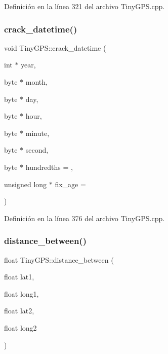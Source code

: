 Definición en la línea 321 del archivo Tiny\+G\+P\+S.\+cpp.

\mbox{\label{class_tiny_g_p_s_a2a9c14bdb5efa8f3f3b8f5dc6553a284}} 
\subsubsection{\texorpdfstring{crack\+\_\+datetime()}{crack\_datetime()}}
{\footnotesize\ttfamily void Tiny\+G\+P\+S\+::crack\+\_\+datetime (\begin{DoxyParamCaption}\item[{int $\ast$}]{year,  }\item[{byte $\ast$}]{month,  }\item[{byte $\ast$}]{day,  }\item[{byte $\ast$}]{hour,  }\item[{byte $\ast$}]{minute,  }\item[{byte $\ast$}]{second,  }\item[{byte $\ast$}]{hundredths = {},  }\item[{unsigned long $\ast$}]{fix\+\_\+age = {} }\end{DoxyParamCaption})}



Definición en la línea 376 del archivo Tiny\+G\+P\+S.\+cpp.

\mbox{\label{class_tiny_g_p_s_a5280f59c83069e5113d85d82a1f2b510}} 
\subsubsection{\texorpdfstring{distance\+\_\+between()}{distance\_between()}}
{\footnotesize\ttfamily float Tiny\+G\+P\+S\+::distance\+\_\+between (\begin{DoxyParamCaption}\item[{float}]{lat1,  }\item[{float}]{long1,  }\item[{float}]{lat2,  }\item[{float}]{long2 }\end{DoxyParamCaption})\hspace{0.3cm}{\ttfamily [static]}}



